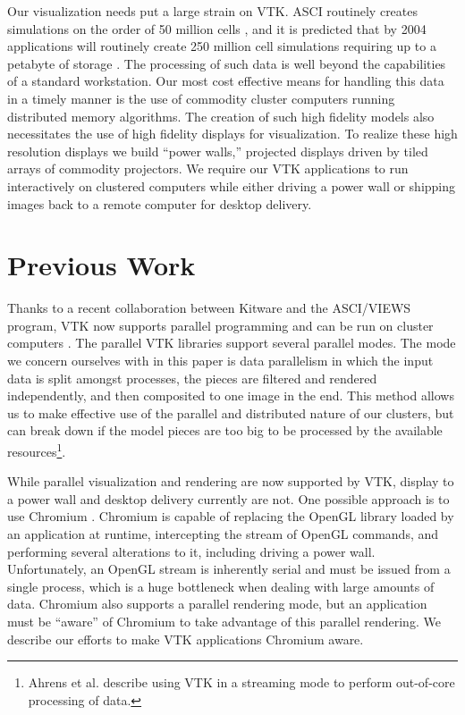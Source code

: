 \documentclass{acmsiggraph}
\begin{document}
  Our visualization needs put a large strain on VTK.  ASCI routinely
  creates simulations on the order of 50 million cells \cite{Heermann99},
  and it is predicted that by 2004 applications will routinely create 250
  million cell simulations requiring up to a petabyte of storage
  \cite{Smith98}.  The processing of such data is well beyond the
  capabilities of a standard workstation.  Our most cost effective means
  for handling this data in a timely manner is the use of commodity cluster
  computers running distributed memory algorithms.  The creation of such
  high fidelity models also necessitates the use of high fidelity displays
  for visualization.  To realize these high resolution displays we build
  ``power walls,'' projected displays driven by tiled arrays of commodity
  projectors.  We require our VTK applications to run interactively on
  clustered computers while either driving a power wall or shipping images
  back to a remote computer for desktop delivery.


  \section{Previous Work}
  \label{sec:previous_work}

  Thanks to a recent collaboration between Kitware and the ASCI/VIEWS
  program, VTK now supports parallel programming and can be run on cluster
  computers \cite{Ahrens00}.  The parallel VTK libraries support several
  parallel modes.  The mode we concern ourselves with in this paper is data
  parallelism in which the input data is split amongst processes, the
  pieces are filtered and rendered independently, and then composited to
  one image in the end.  This method allows us to make effective use of the
  parallel and distributed nature of our clusters, but can break down if
  the model pieces are too big to be processed by the available
  resources\footnote{Ahrens et al. \cite{Ahrens01} describe using VTK in a
  streaming mode to perform out-of-core processing of data.}.

  While parallel visualization and rendering are now supported by VTK,
  display to a power wall and desktop delivery currently are not.  One
  possible approach is to use Chromium \cite{Humphreys02}.  Chromium is
  capable of replacing the OpenGL library loaded by an application at
  runtime, intercepting the stream of OpenGL commands, and performing
  several alterations to it, including driving a power wall.
  Unfortunately, an OpenGL stream is inherently serial and must be issued
  from a single process, which is a huge bottleneck when dealing with large
  amounts of data.  Chromium also supports a parallel rendering mode, but
  an application must be ``aware'' of Chromium to take advantage of this
  parallel rendering.  We describe our efforts to make VTK applications
  Chromium aware.
\end{document}
